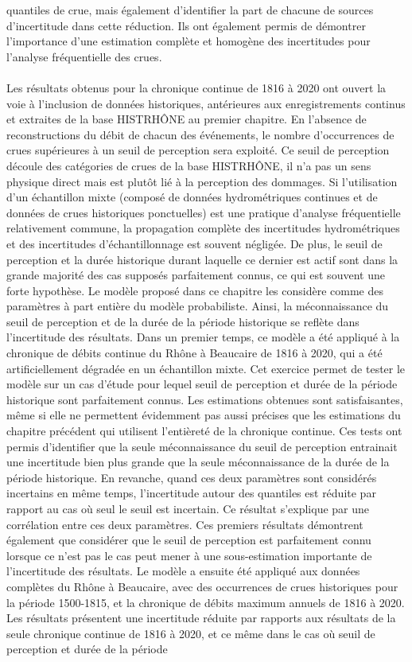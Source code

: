 quantiles de crue, mais également d'identifier la part de chacune de sources d'incertitude dans cette réduction. Ils ont également permis de démontrer l'importance d'une estimation complète et homogène des incertitudes pour l'analyse fréquentielle des crues. 
	
	\paragraph{} Les résultats obtenus pour la chronique continue de 1816 à 2020 ont ouvert la voie à l'inclusion de données historiques, antérieures aux enregistrements continus et extraites de la base HISTRHÔNE au premier chapitre. En l'absence de reconstructions du débit de chacun des événements, le nombre d'occurrences de crues supérieures à un seuil de perception sera exploité. Ce seuil de perception découle des catégories de crues de la base HISTRHÔNE, il n'a pas un sens physique direct mais est plutôt lié à la perception des dommages. Si l'utilisation d'un échantillon mixte (composé de données hydrométriques continues et de données de crues historiques ponctuelles) est une pratique d'analyse fréquentielle relativement commune, la propagation complète des incertitudes hydrométriques et des incertitudes d'échantillonnage est souvent négligée. De plus, le seuil de perception et la durée historique durant laquelle ce dernier est actif sont dans la grande majorité des cas supposés parfaitement connus, ce qui est souvent une forte hypothèse. Le modèle proposé dans ce chapitre les considère comme des paramètres à part entière du modèle probabiliste. Ainsi, la méconnaissance du seuil de perception et de la durée de la période historique se reflète dans l'incertitude des résultats. Dans un premier temps, ce modèle a été appliqué à la chronique de débits continue du Rhône à Beaucaire de 1816 à 2020, qui a été artificiellement dégradée en un échantillon mixte. Cet exercice permet de tester le modèle sur un cas d'étude pour lequel seuil de perception et durée de la période historique sont parfaitement connus. Les estimations obtenues sont satisfaisantes, même si elle ne permettent évidemment pas aussi précises que les estimations du chapitre précédent qui utilisent l'entièreté de la chronique continue. Ces tests ont permis d'identifier que la seule méconnaissance du seuil de perception entrainait une incertitude bien plus grande que la seule méconnaissance de la durée de la période historique. En revanche, quand ces deux paramètres sont considérés incertains en même temps, l'incertitude autour des quantiles est réduite par rapport au cas où seul le seuil est incertain. Ce résultat s'explique par une corrélation entre ces deux paramètres. Ces premiers résultats démontrent également que considérer que le seuil de perception est parfaitement connu lorsque ce n'est pas le cas peut mener à une sous-estimation importante de l'incertitude des résultats. Le modèle a ensuite été appliqué aux données complètes du Rhône à Beaucaire, avec des occurrences de crues historiques pour la période 1500-1815, et la chronique de débits maximum annuels de 1816 à 2020. Les résultats présentent une incertitude réduite par rapports aux résultats de la seule chronique continue de 1816 à 2020, et ce même dans le cas où seuil de perception et durée de la période
